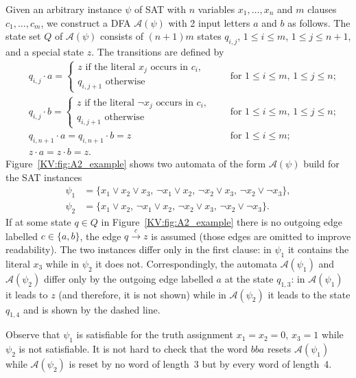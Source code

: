 \documentclass{irmaart}
\theoremstyle{plain}
\begin{document}
Given an arbitrary instance $\psi$ of \textsc{SAT} with $n$
variables $x_1,\dots,x_n$ and $m$ clauses $c_1,\dots,c_m$, we
construct a DFA $\mathcal{A}(\psi)$ with 2 input letters $a$ and
$b$ as follows. The state set $Q$ of $\mathcal{A}(\psi)$ consists
of $(n+1)m$ states $q_{i,j}$, $1 \le i \le m$, $1 \le j \le n+1$,
and a special state $z$. The transitions are defined by
\begin{align*}
& q_{i,j}\cdot a =
\begin{cases}
    z \text{ if the literal $x_j$ occurs in $c_i$},\\
    q_{i,j+1} \text{ otherwise}
\end{cases} && \text{ for $1 \le i \le m$, $1 \le j \le n$;} \\
&q_{i,j}\cdot b =
\begin{cases}
    z \text{ if the literal $\neg x_j$ occurs in $c_i$},\\
    q_{i,j+1} \text{ otherwise}
\end{cases} && \text{ for $1 \le i \le m$, $1 \le j \le n$;} \\
&q_{i,n+1}\cdot a=q_{i,n+1}\cdot b =z && \text{ for $1\le i\le
m$;}\\  &z\cdot a=z\cdot b =z.&&
\end{align*}
Figure~\ref{KV:fig:A2_example} shows two automata of the form
$\mathcal{A}(\psi)$ build for the \textsc{SAT} instances
\begin{align*}
\psi_1&=\{x_1 \vee x_2 \vee x_3,\, \neg x_1 \vee x_2,\, \neg x_2
\vee x_3,\,\neg x_2 \vee \neg x_3\},\\
\psi_2&=\{x_1 \vee x_2,\,\neg x_1 \vee x_2,\, \neg x_2 \vee
x_3,\,\neg x_2 \vee \neg x_3\}.
\end{align*}
If at some state $q\in Q$ in Figure~\ref{KV:fig:A2_example} there
is no outgoing edge labelled $c\in\{a,b\}$, the edge
$q\stackrel{c}{\to}z$ is assumed (those edges are omitted to
improve readability). The two instances differ only in the first
clause: in $\psi_1$ it contains the literal $x_3$ while in
$\psi_2$ it does not. Correspondingly, the automata
$\mathcal{A}(\psi_1)$ and $\mathcal{A}(\psi_2)$ differ only by the
outgoing edge labelled $a$ at the state $q_{1,3}$: in
$\mathcal{A}(\psi_1)$ it leads to $z$ (and therefore, it is not
shown) while in $\mathcal{A}(\psi_2)$ it leads to the state
$q_{1,4}$ and is shown by the dashed line.

Observe that $\psi_1$ is satisfiable for the truth assignment
$x_1=x_2=0$, $x_3=1$ while $\psi_2$ is not satisfiable. It is not
hard to check that the word $bba$ resets $\mathcal{A}(\psi_1)$
while $\mathcal{A}(\psi_2)$ is reset by no word of length~3 but by
every word of length~4.
\end{document}
